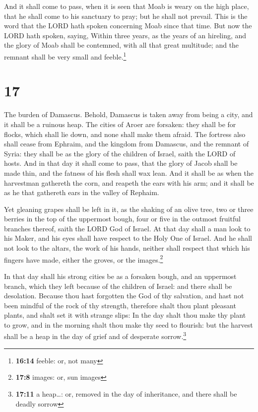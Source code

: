  And it shall come to pass, when it is seen that Moab is
weary on the high place, that he shall come to his sanctuary to pray;
but he shall not prevail.  This is the word that the LORD
hath spoken concerning Moab since that time.  But now the
LORD hath spoken, saying, Within three years, as the years of an
hireling, and the glory of Moab shall be contemned, with all that great
multitude; and the remnant shall be very small and feeble.\footnote{\textbf{16:14}
  feeble: or, not many}

\hypertarget{section-16}{%
\section{17}\label{section-16}}

 The burden of Damascus. Behold, Damascus is taken away
from being a city, and it shall be a ruinous heap.  The
cities of Aroer are forsaken: they shall be for flocks, which shall lie
down, and none shall make them afraid.  The fortress also
shall cease from Ephraim, and the kingdom from Damascus, and the remnant
of Syria: they shall be as the glory of the children of Israel, saith
the LORD of hosts.  And in that day it shall come to pass,
that the glory of Jacob shall be made thin, and the fatness of his flesh
shall wax lean.  And it shall be as when the harvestman
gathereth the corn, and reapeth the ears with his arm; and it shall be
as he that gathereth ears in the valley of Rephaim.

 Yet gleaning grapes shall be left in it, as the shaking
of an olive tree, two or three berries in the top of the uppermost
bough, four or five in the outmost fruitful branches thereof, saith the
LORD God of Israel.  At that day shall a man look to his
Maker, and his eyes shall have respect to the Holy One of Israel.
 And he shall not look to the altars, the work of his
hands, neither shall respect that which his fingers have made, either
the groves, or the images.\footnote{\textbf{17:8} images: or, sun images}

 In that day shall his strong cities be as a forsaken
bough, and an uppermost branch, which they left because of the children
of Israel: and there shall be desolation.  Because thou
hast forgotten the God of thy salvation, and hast not been mindful of
the rock of thy strength, therefore shalt thou plant pleasant plants,
and shalt set it with strange slips:  In the day shalt
thou make thy plant to grow, and in the morning shalt thou make thy seed
to flourish: but the harvest shall be a heap in the day of grief and of
desperate sorrow.\footnote{\textbf{17:11} a heap\ldots: or, removed in
  the day of inheritance, and there shall be deadly sorrow}

